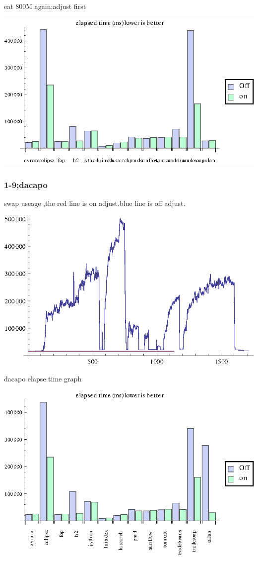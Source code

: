\documentclass{article}
\begin{document}
eat 800M again;adjust first

\includegraphics{workload_gr6.eps}

\subsubsection*{1-9;dacapo}

swap useage ,the red line is on adjust.blue line is off adjust.

\includegraphics{workload_gr7.eps}

dacapo elapse time graph

\includegraphics{workload_gr8.eps}
\end{document}
